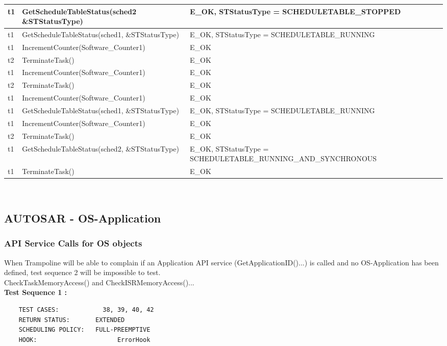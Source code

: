 \documentclass[10pt]{article}
\newlength{\Li}\settowidth{\Li}{Running}
\newlength{\Lii}\setlength{\Lii}{7cm}
\newlength{\Liiii}\setlength{\Liiii}{0.9cm}
\newlength{\Liii}\setlength{\Liii}{\textwidth} \addtolength{\Liii}{-\Li} \addtolength{\Liii}{-\Lii} \addtolength{\Liii}{-\Liiii}
\begin{document}
\begin{supertabular}{|p{\Li}|p{\Lii}|p{\Liii}|p{\Liiii}|}
	t1		& GetScheduleTableStatus(sched2 \&STStatusType)						& E\_OK, STStatusType = SCHEDULETABLE\_STOPPED							& \\ \hline
	t1		& GetScheduleTableStatus(sched1, \&STStatusType)						& E\_OK, STStatusType = SCHEDULETABLE\_RUNNING							& \\ \hline
	t1		& IncrementCounter(Software\_Counter1)								& E\_OK																	& \\ \hline
	t2		& TerminateTask()													& E\_OK																	& \\ \hline
	t1		& IncrementCounter(Software\_Counter1)								& E\_OK																	& \\ \hline
	t2		& TerminateTask()													& E\_OK																	& \\ \hline
	t1		& IncrementCounter(Software\_Counter1)								& E\_OK																	& \\ \hline
	t1		& GetScheduleTableStatus(sched1, \&STStatusType)						& E\_OK, STStatusType = SCHEDULETABLE\_RUNNING							& \\ \hline
	t1		& IncrementCounter(Software\_Counter1)								& E\_OK																	& \\ \hline
	t2		& TerminateTask()													& E\_OK																	& \\ \hline
	t1		& GetScheduleTableStatus(sched2, \&STStatusType)						& E\_OK, STStatusType = SCHEDULETABLE\_RUNNING\_\-AND\_SYNCHRONOUS		& \\ \hline
	t1		& TerminateTask()													& E\_OK																	& \\ \hline
	\end{supertabular}\\

\subsection{AUTOSAR - OS-Application}
	
	\subsubsection{API Service Calls for OS objects}
	When Trampoline will be able to complain if an Application API service (GetApplicationID()...) is called and no OS-Application has been defined, test sequence 2 will be impossible to test.\\	
	CheckTaskMemoryAccess() and CheckISRMemoryAccess()... \\ 
	
	\textbf{Test Sequence 1 :}
	\begin{lstlisting}
	TEST CASES:		       38, 39, 40, 42
	RETURN STATUS:	  	 EXTENDED
	SCHEDULING POLICY:   FULL-PREEMPTIVE
	HOOK:			           ErrorHook
	\end{lstlisting}
	
	
\end{document}
